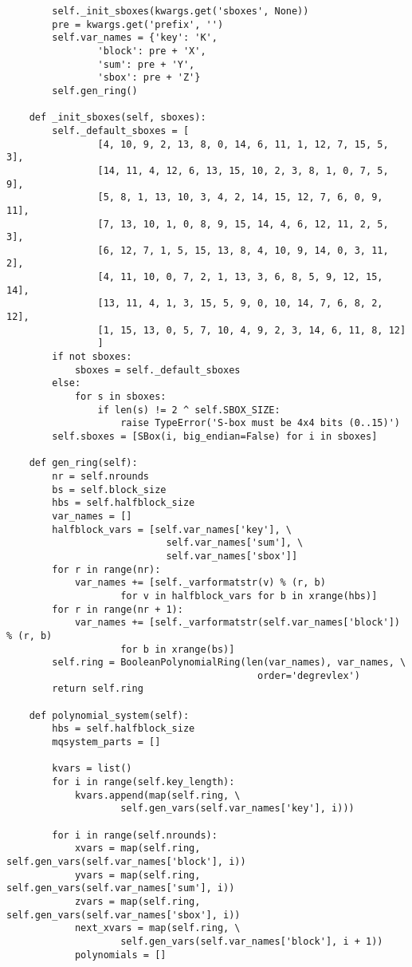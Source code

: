 \begin{lstlisting}
        self._init_sboxes(kwargs.get('sboxes', None))
        pre = kwargs.get('prefix', '')
        self.var_names = {'key': 'K',
                'block': pre + 'X',
                'sum': pre + 'Y',
                'sbox': pre + 'Z'}
        self.gen_ring()

    def _init_sboxes(self, sboxes):
        self._default_sboxes = [
                [4, 10, 9, 2, 13, 8, 0, 14, 6, 11, 1, 12, 7, 15, 5, 3],
                [14, 11, 4, 12, 6, 13, 15, 10, 2, 3, 8, 1, 0, 7, 5, 9],
                [5, 8, 1, 13, 10, 3, 4, 2, 14, 15, 12, 7, 6, 0, 9, 11],
                [7, 13, 10, 1, 0, 8, 9, 15, 14, 4, 6, 12, 11, 2, 5, 3],
                [6, 12, 7, 1, 5, 15, 13, 8, 4, 10, 9, 14, 0, 3, 11, 2],
                [4, 11, 10, 0, 7, 2, 1, 13, 3, 6, 8, 5, 9, 12, 15, 14],
                [13, 11, 4, 1, 3, 15, 5, 9, 0, 10, 14, 7, 6, 8, 2, 12],
                [1, 15, 13, 0, 5, 7, 10, 4, 9, 2, 3, 14, 6, 11, 8, 12]
                ]
        if not sboxes:
            sboxes = self._default_sboxes
        else:
            for s in sboxes:
                if len(s) != 2 ^ self.SBOX_SIZE:
                    raise TypeError('S-box must be 4x4 bits (0..15)')
        self.sboxes = [SBox(i, big_endian=False) for i in sboxes]

    def gen_ring(self):
        nr = self.nrounds
        bs = self.block_size
        hbs = self.halfblock_size
        var_names = []
        halfblock_vars = [self.var_names['key'], \
                            self.var_names['sum'], \
                            self.var_names['sbox']]
        for r in range(nr):
            var_names += [self._varformatstr(v) % (r, b)
                    for v in halfblock_vars for b in xrange(hbs)]
        for r in range(nr + 1):
            var_names += [self._varformatstr(self.var_names['block']) % (r, b)
                    for b in xrange(bs)]
        self.ring = BooleanPolynomialRing(len(var_names), var_names, \
                                            order='degrevlex')
        return self.ring

    def polynomial_system(self):
        hbs = self.halfblock_size
        mqsystem_parts = []

        kvars = list()
        for i in range(self.key_length):
            kvars.append(map(self.ring, \
                    self.gen_vars(self.var_names['key'], i)))

        for i in range(self.nrounds):
            xvars = map(self.ring, self.gen_vars(self.var_names['block'], i))
            yvars = map(self.ring, self.gen_vars(self.var_names['sum'], i))
            zvars = map(self.ring, self.gen_vars(self.var_names['sbox'], i))
            next_xvars = map(self.ring, \
                    self.gen_vars(self.var_names['block'], i + 1))
            polynomials = []


\end{lstlisting}
